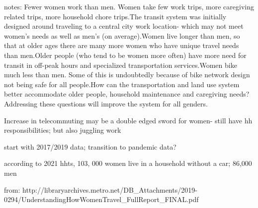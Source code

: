 \documentclass[
  12pt,
]{article}
\begin{document}
\begin{flushleft}

notes: 
Fewer women work than men. Women take few work trips, more caregiving related trips, more household chore trips.The transit system was initially designed around traveling to a central city work location- which may not meet women's needs as well as men's (on average).Women live longer than men, so that at older ages there are many more women who have unique travel needs than men.Older people (who tend to be women more often) have more need for transit in off-peak hours and specialized transportation services.Women bike much less than men. Some of this is undoubtedly because of bike network design not being safe for all people.How can the transportation and land use system better accommodate older people, household maintenance and caregiving needs? Addressing these questions will improve the system for all genders.


Increase in telecommuting may be a double edged sword for women- still have hh responsibilities; but also juggling work



start with 2017/2019 data; transition to pandemic data?


according to 2021 hhts, 103, 000 women live in a household without a car; 86,000 men

from: http://libraryarchives.metro.net/DB_Attachments/2019-0294/UnderstandingHowWomenTravel_FullReport_FINAL.pdf


\end{flushleft}
\end{document}
